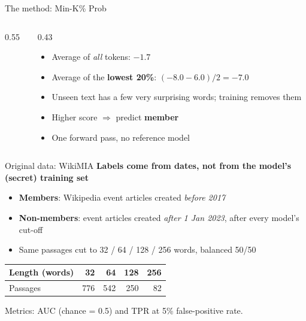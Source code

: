 \documentclass[aspectratio=169,10pt]{beamer}
\newcommand{\muted}[1]{{\color{ink2}#1}}
\begin{document}
\begin{frame}{The method: Min-K\% Prob}
  \begin{columns}[c]
    \begin{column}{0.55\textwidth}
    \end{column}
    \begin{column}{0.43\textwidth}
      \begin{itemize}\setlength\itemsep{4pt}
        \item Average of \emph{all} tokens: $-1.7$
        \item Average of the \textbf{lowest 20\%}: $(-8.0-6.0)/2=\mathbf{-7.0}$
        \item Unseen text has a few very surprising words; training removes them
        \item Higher score $\Rightarrow$ predict \textbf{member}
        \item One forward pass, no reference model
      \end{itemize}
    \end{column}
  \end{columns}
\end{frame}

\begin{frame}{Original data: WikiMIA}
  \textbf{Labels come from dates, not from the model's (secret) training set}
  \begin{itemize}\setlength\itemsep{3pt}
    \item \textbf{Members}: Wikipedia event articles created \emph{before 2017}
    \item \textbf{Non-members}: event articles created \emph{after 1 Jan 2023}, after every model's cut-off
    \item Same passages cut to 32 / 64 / 128 / 256 words, balanced 50/50
  \end{itemize}
  \vspace{0.4em}
  \centering
  \begin{tabular}{lrrrr}
    \toprule
    Length (words) & 32 & 64 & 128 & 256 \\
    \midrule
    Passages & 776 & 542 & 250 & 82 \\
    \bottomrule
  \end{tabular}
  \vspace{0.5em}

  \muted{Metrics: AUC (chance = 0.5) and TPR at 5\% false-positive rate.}
\end{frame}
\end{document}
